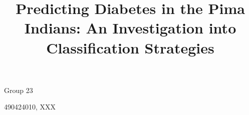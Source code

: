 \documentclass[a4paper, 12pt]{article}
\begin{document}
\title{Predicting Diabetes in the Pima Indians: An Investigation into Classification Strategies}
\maketitle

\begin{center}Group 23\end{center}
\begin{center}490424010, XXX\end{center}

\tableofcontents
\listoffigures
\listoftables









\end{document}

